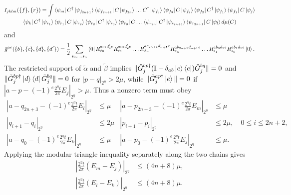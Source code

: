 \documentclass[aps,floatfix,10pt,amssymb,amsfont,amsmath,superscriptaddress,float,nofootinbib,longbibliography,nobalancelastpage,twocolumn]{revtex4-2}
\begin{document}
\begin{widetext}
\begin{multline}
\end{multline}
\begin{multline}
I_{jklm}(\{f\},\{r\})=\int\bra{\psi_{m}}C^{\dagger}\ket{\psi_{f_{2n+1}}}\bra{\psi_{f_{2n+1}}}C\ket{\psi_{f_{2n}}}\ldots C^{\dagger}\ket{\psi_{f_3}}\bra{\psi_{f_3}}C\ket{\psi_{f_2}}\bra{\psi_{f_2}}C^{\dagger}\ket{\psi_{f_1}}\bra{\psi_{f_1}}C\ket{\psi_j}
\\\bra{\psi_k}C^{\dagger}\ket{\psi_{r_1}}\bra{\psi_{r_1}}C\ket{\psi_{r_2}}\bra{\psi_{r_2}}C^{\dagger}\ket{\psi_{r_3}}\bra{\psi_{r_3}}C\ldots \bra{\psi_{r_{2n}}}C^{\dagger}\ket{\psi_{r_{2n+1}}}\bra{\psi_{r_{2n+1}}}C\ket{\psi_{l}}d\mu(C)
\end{multline}
and
\begin{equation}
       \bar g^{ae}(\{b\},\{c\},\{d\},\{d'\}) = \frac12\sum_{s_0,\ldots,s_n}
       \bra{0}R_{s_0}^{ac_1d'_1e}R_{s_1}^{ac_3d'_2e}\ldots
       R_{s_n}^{ac_{2n+1}d'_{n+1}e} R_{s_n}^{ab_{2n+1}d_{n+1}e}\ldots
       R_{s_1}^{ab_3d_2e}R_{s_0}^{ab_1d_1e}\ket{0}.
       \label{eq:gbar-definition}
\end{equation}
The restricted support of $\tilde\alpha$ and $\tilde\beta$ implies
$\|\tilde G^{bp\dagger}_{j}(\mathbb{I} - \delta_{ab}\ket{e}\bra{e})\tilde G^{bq}_{j}\| = 0$ and
$\|\tilde G^{bp\dagger}_{j}\ket{d}\bra{d}\tilde G^{bq}_{j}\| = 0$
for $|p-q|_{2^{\eta}} > 2\mu$, while
$\|\tilde G^{ap \dagger}_j \ket{e}\| = 0$ if
$|a-p-(-1)^e\frac{2^{\eta}t}{2\pi}E_j|_{2^\eta}>\mu$.  Thus a nonzero
term must obey
\begin{equation}
\begin{aligned}
    |a-q_{2n+3}-(-1)^e\tfrac{2^{\eta}t}{2\pi}E_l|_{2^{\eta}} &\leq \mu
    &|a-p_{2n+3}-(-1)^e\tfrac{2^{\eta}t}{2\pi}E_m|_{2^{\eta}} &\leq \mu\\
    |q_{i+1}-q_i|_{2^{\eta}} &\leq 2\mu
    &|p_{i+1}-p_i|_{2^{\eta}} &\leq 2\mu,\quad 0\leq i\leq2n+2,\\
    |a-q_0-(-1)^{e}\tfrac{2^{\eta}t}{2\pi}E_k|_{2^{\eta}} &\leq \mu
    &|a-p_0-(-1)^{e}\tfrac{2^{\eta}t}{2\pi}E_j|_{2^{\eta}}& \leq \mu.
\end{aligned}
\end{equation}
Applying the modular triangle inequality separately along the two chains gives
\begin{equation}
\begin{aligned}
    \left|\frac{2^{\eta}t}{2\pi}(E_m-E_j)\right|_{2^{\eta}}&\leq(4n+8)\mu,\\
    \left|\frac{2^{\eta}t}{2\pi}(E_l-E_k)\right|_{2^{\eta}}&\leq(4n+8)\mu.
\end{aligned}

\end{equation}
\end{widetext}
\end{document}
